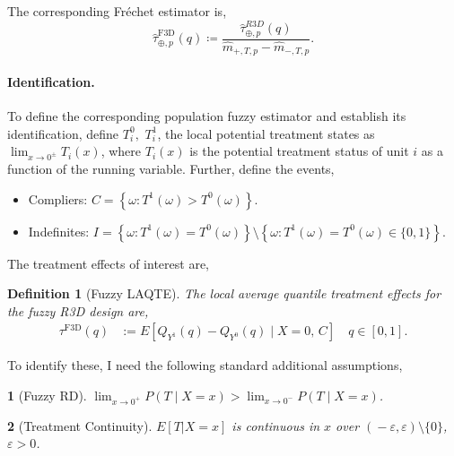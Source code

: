 \documentclass[12pt]{article}
\newtheorem{definition}{Definition}
\newtheorem{assumpI}{}
\begin{document}
The corresponding Fr\'echet estimator is,
\begin{equation}
\hat{\tau}^{\mathrm{F3D}}_{\oplus, p}(q) \coloneqq \frac{\hat{\tau}_{\oplus,p}^{R3D}(q)}{\hat{m}_{+,T,p} - \hat{m}_{-,T,p}}.
\end{equation}

\paragraph{Identification.} 

To define the corresponding population fuzzy estimator and establish its identification, define $T_i^0,$ $T_i^1$, the local potential treatment states as $\lim_{x \to 0^\pm} T_i(x)$, where $T_i(x)$ is the potential treatment status of unit $i$ as a function of the running variable. Further, define the events,
\begin{itemize}
\item Compliers: $C=\left\{\omega: T^1(\omega)>T^0(\omega)\right\}$.
\item Indefinites: $I=\left\{\omega: T^1(\omega)=T^0(\omega)\right\} \setminus\left\{\omega: T^1(\omega)=T^0(\omega) \in\{0,1\}\right\}$.
\end{itemize}
The treatment effects of interest are,
\begin{definition}[Fuzzy LAQTE]
The local average quantile treatment effects for the fuzzy R3D design are,
\begin{align} \tau^{\mathrm{F3D}}(q) & :=E\left[Q_{Y^1}(q)-Q_{Y^0}(q) \mid X=0, \, C\right] \quad q \in[0,1]. \end{align}
\end{definition}

To identify these, I need the following standard additional assumptions, 
\begin{assumpI}[Fuzzy RD] \label{asspt:i_fuzzyrd}
$\lim_{x \to 0^+} P(T \mid X=x) >\lim_{x \to 0^-} P(T \mid X=x) $.
\end{assumpI}
\begin{assumpI}[Treatment Continuity] \label{asspt:i_treatment_continuity}
$E[T|X=x]$ is continuous in $x$ over $(\!-\!\varepsilon, \varepsilon) \setminus \{ 0 \}$, $\varepsilon > 0$.
\end{assumpI}
\end{document}
